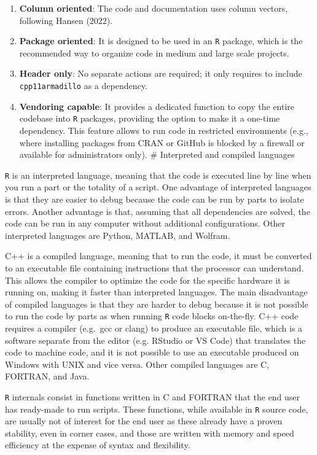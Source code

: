 \begin{enumerate}
\def\labelenumi{\arabic{enumi}.}
\tightlist
\item
  \textbf{Column oriented}: The code and documentation uses column vectors,
  following Hansen (2022).
\item
  \textbf{Package oriented}: It is designed to be used in an \texttt{R} package, which is
  the recommended way to organize code in medium and large scale projects.
\item
  \textbf{Header only}: No separate actions are required; it only requires to
  include \texttt{cpp11armadillo} as a dependency.
\item
  \textbf{Vendoring capable}: It provides a dedicated function to copy the entire
  codebase into \texttt{R} packages, providing the option to make it a one-time
  dependency. This feature allows to run code in restricted environments
  (e.g., where installing packages from CRAN or GitHub is blocked by a
  firewall or available for administrators only).
  \# Interpreted and compiled languages
\end{enumerate}

\texttt{R} is an interpreted language, meaning that the code is executed line by line
when you run a part or the totality of a script. One advantage of interpreted
languages is that they are easier to debug because the code can be run by parts
to isolate errors. Another advantage is that, assuming that all dependencies
are solved, the code can be run in any computer without additional
configurations. Other interpreted languages are Python, MATLAB, and
Wolfram.

C++ is a compiled language, meaning that to run the code, it must be
converted to an executable file containing instructions that the processor
can understand. This allows the compiler to optimize the code for the specific
hardware it is running on, making it faster than interpreted languages. The
main disadvantage of compiled languages is that they are harder to debug
because it is not possible to run the code by parts as when running \texttt{R} code
blocks on-the-fly. C++ code requires a compiler (e.g.~gcc or clang) to
produce an executable file, which is a software separate from the editor (e.g.
RStudio or VS Code) that translates the code to machine code, and it is not
possible to use an executable produced on Windows with UNIX and vice versa.
Other compiled languages are C, FORTRAN, and Java.

\texttt{R} internals consist in functions written in C and FORTRAN that the end
user has ready-made to run scripts. These functions, while available in \texttt{R}
source code, are usually not of interest for the end user as these already have
a proven stability, even in corner cases, and those are written with memory and
speed efficiency at the expense of syntax and flexibility.

